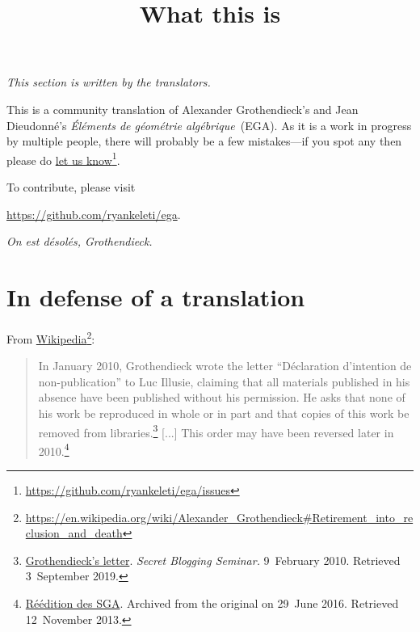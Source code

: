 


\title{What this is}
\maketitle

\label{section:phantom}

\noindent
\emph{This section is written by the translators.}

\noindent
This is a community translation of Alexander Grothendieck's and Jean Dieudonn\'e's \emph{\'El\'ements de g\'eom\'etrie alg\'ebrique}~(EGA).
As it is a work in progress by multiple people, there will probably be a few mistakes---if you spot any then please do \href{https://github.com/ryankeleti/ega/issues}{let us know}\footnote{\url{https://github.com/ryankeleti/ega/issues}}.

\noindent
To contribute, please visit
\begin{center}
  \url{https://github.com/ryankeleti/ega}.
\end{center}

\noindent
\emph{On est d\'esol\'es, Grothendieck.}

\section*{In defense of a translation}

From \href{https://en.wikipedia.org/wiki/Alexander_Grothendieck\#Retirement_into_reclusion_and_death}{Wikipedia}\footnote{\url{https://en.wikipedia.org/wiki/Alexander_Grothendieck\#Retirement_into_reclusion_and_death}}:

\begin{quote}
In January 2010, Grothendieck wrote the letter ``D\'eclaration d'intention de non-publication'' to Luc Illusie, claiming that all materials published in his absence have been published without his permission.
He asks that none of his work be reproduced in whole or in part and that copies of this work be removed from libraries.\footnote{\href{https://sbseminar.wordpress.com/2010/02/09/grothendiecks-letter/}{Grothendieck's letter}. \emph{Secret Blogging Seminar.} 9~February 2010. Retrieved 3~September 2019.}
[...]
This order may have been reversed later in 2010.\footnote{\href{https://web.archive.org/web/20160629235119/http://www.math.u-psud.fr/~laszlo/sga4.html}{R\'e\'edition des SGA}. Archived from the original on 29~June 2016. Retrieved 12~November 2013.}
\end{quote}

